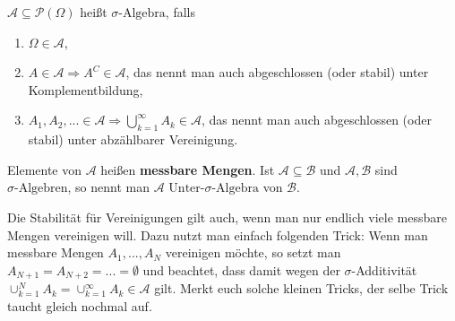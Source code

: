 \begin{lDef}
\begin{deff} 
	$\mathcal{A} \subseteq \mathcal{P}(\Omega)$ heißt $\sigma\text{-Algebra}$, falls
	\begin{enumerate}[label=(\roman*)]
		\item $\Omega \in \mathcal{A}$,
		\item $A \in \mathcal{A} \Rightarrow A^C \in \mathcal{A}$, das nennt man auch abgeschlossen (oder stabil) unter Komplementbildung,
		\item $A_{1},A_{2},... \in \mathcal{A} \Rightarrow \bigcup\limits_{k=1}^{\infty}A_k \in \mathcal{A}$, das nennt man auch abgeschlossen (oder stabil) unter abzählbarer Vereinigung.
	\end{enumerate}
	Elemente von $\mathcal{A}$ heißen \textbf{messbare Mengen}. Ist $\mathcal{A} \subseteq \mathcal{B}$ und $\mathcal{A}, \mathcal{B}$ sind $\sigma\text{-Algebren}$, so nennt man $\mathcal{A}$ $\text{Unter-}\sigma\text{-Algebra}$ von $\mathcal{B}$.
\end{deff}
\end{lDef}
Die Stabilit\"at f\"ur Vereinigungen gilt auch, wenn man nur endlich viele messbare Mengen vereinigen will. Dazu nutzt man einfach folgenden Trick: Wenn man messbare Mengen $A_1,...,A_N$ vereinigen m\"ochte, so setzt man $A_{N+1}=A_{N+2}=... =\emptyset$ und beachtet, dass damit wegen der $\sigma$-Additivit\"at $\cup_{k=1}^N A_k=\cup_{k=1}^\infty A_k\in \mathcal A$ gilt. Merkt euch solche kleinen Tricks, der selbe Trick taucht gleich nochmal auf.
